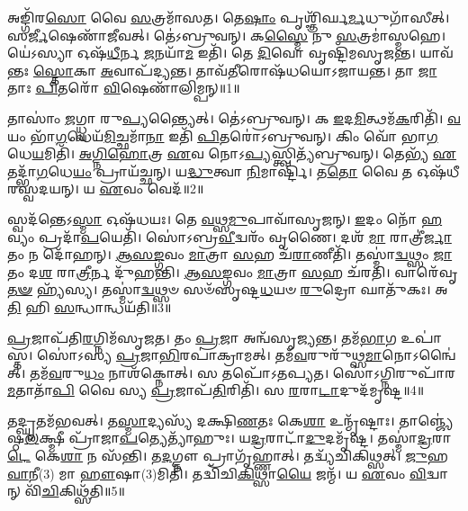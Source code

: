 \setcounter{anuvakam}{0}

𑌅𑌙𑍍𑌗𑌿᳴𑌰\-\ul{𑌸𑍋} 𑌵𑍈 \ul{𑌸}\-𑌤𑍍𑌰𑌮𑌾᳴𑌸𑌤।
𑌤𑍇\-\ul{𑌷𑌾𑌂} 𑌪𑍃𑌶𑍍𑌞𑌿᳴𑌰𑍍𑌘\-\ul{𑌰𑍍𑌮}\-𑌧𑍁𑌗𑌾᳴𑌸𑍀𑌤𑍍।
𑌸\-\ul{𑌰𑍍𑌜𑍀}\-𑌷𑍇𑌣𑌾᳴𑌜𑍀𑌵𑌤𑍍।
𑌤𑍇॑𑌽𑌬𑍍𑌰𑍁𑌵𑌨𑍍।
𑌕\-\ul{𑌸𑍍𑌮𑍈} 𑌨𑍁 \ul{𑌸}\-𑌤𑍍𑌰𑌮𑌾॑𑌸𑍍𑌮𑌹𑍇।
𑌯𑍇॑𑌽𑌸𑍍𑌯𑌾 𑌓𑌷᳴\-\ul{𑌧𑍀}\-𑌰𑍍𑌨 \ul{𑌜}\-𑌨𑌯𑌾᳴\-\ul{𑌮} 𑌇𑌤𑌿᳴।
𑌤𑍇 \ul{𑌦𑌿}\-𑌵𑍋 𑌵𑍃𑌷𑍍𑌟𑌿᳴𑌮𑌸𑍃𑌜𑌨𑍍𑌤।
𑌯𑌾𑌵᳴𑌨𑍍𑌤𑌃 \ul{𑌸𑍍𑌤𑍋}\-𑌕𑌾 \ul{𑌅}\-𑌵𑌾𑌪᳴𑌦𑍍𑌯𑌨𑍍𑌤।
𑌤𑌾𑌵᳴\-\ul{𑌤𑍀}\-𑌰𑍋𑌷᳴𑌧𑌯𑍋\-𑌽𑌜𑌾𑌯𑌨𑍍𑌤।
𑌤𑌾 \ul{𑌜𑌾}\-𑌤𑌾𑌃 \ul{𑌪𑌿}\-𑌤𑌰𑍋᳴ \ul{𑌵𑌿}\-𑌷𑍇𑌣𑌾᳴𑌲𑌿𑌮𑍍𑌪𑌨𑍍॥1॥

𑌤𑌾𑌸𑌾𑌂॑ \ul{𑌜}\-𑌗𑍍𑌧𑍍𑌵𑌾 𑌰𑍁\-\ul{𑌪𑍍𑌯}\-𑌨𑍍𑌤𑍍𑌯𑍈𑌤𑍍।
𑌤𑍇॑𑌽𑌬𑍍𑌰𑍁𑌵𑌨𑍍।
𑌕 \ul{𑌇}\-𑌦\-\ul{𑌮𑌿}\-𑌤𑍍𑌥𑌮᳴\-\ul{𑌕}\-𑌰𑌿𑌤𑌿᳴।
\-\ul{𑌵}\-𑌯𑌂 𑌭𑌾᳴\-\ul{𑌗}\-𑌧𑍇𑌯᳴\-\ul{𑌮𑌿}\-𑌚𑍍𑌛𑌮𑌾᳴\-\ul{𑌨𑌾} 𑌇𑌤𑌿᳴ \ul{𑌪𑌿}\-𑌤𑌰𑍋॑\-𑌽𑌬𑍍𑌰𑍁𑌵𑌨𑍍।
𑌕𑌿𑌂 𑌵𑍋᳴ 𑌭𑌾\-\ul{𑌗}\-𑌧𑍇\-\ul{𑌯}\-𑌮𑌿𑌤𑌿᳴।
\-\ul{𑌅}\-\-\ul{𑌗𑍍𑌨𑌿}\-\-\ul{𑌹𑍋}\-𑌤𑍍𑌰 \ul{𑌏}\-𑌵 𑌨𑍋𑌽\-\ul{𑌪𑍍𑌯}\-𑌸𑍍𑌤𑍍𑌵𑌿𑌤𑍍𑌯᳴𑌬𑍍𑌰𑍁𑌵𑌨𑍍।
𑌤𑍇𑌭𑍍𑌯᳴ \ul{𑌏}\-𑌤𑌦𑍍𑌭𑌾᳴\-\ul{𑌗}\-𑌧𑍇\-\ul{𑌯𑌂} 𑌪𑍍𑌰𑌾𑌯᳴𑌚𑍍𑌛𑌨𑍍।
𑌯\-\ul{𑌦𑍍𑌧𑍁}\-𑌤𑍍𑌵𑌾 \ul{𑌨𑌿}\-𑌮𑌾𑌰𑍍𑌷𑍍𑌟𑌿᳴।
𑌤\-\ul{𑌤𑍋} 𑌵𑍈 𑌤 𑌓𑌷᳴𑌧𑍀𑌰𑌸𑍍𑌵𑌦𑌯𑌨𑍍।
𑌯 \ul{𑌏}\-𑌵𑌂 𑌵𑍇𑌦᳴॥2॥

𑌸𑍍𑌵𑌦᳴𑌨𑍍𑌤𑍇\-𑌽\-\ul{𑌸𑍍𑌮𑌾} 𑌓𑌷᳴𑌧𑌯𑌃।
𑌤𑍇 \ul{𑌵}\-𑌥𑍍𑌸\-\ul{𑌮𑍁}\-𑌪𑌾𑌵𑌾᳴𑌸𑍃𑌜𑌨𑍍।
\-\ul{𑌇}\-𑌦𑌂 𑌨𑍋᳴ \ul{𑌹}\-𑌵𑍍𑌯𑌂 𑌪𑍍𑌰𑌦𑌾᳴\-\ul{𑌪}\-𑌯𑍇𑌤𑌿᳴।
𑌸𑍋॑𑌽𑌬𑍍𑌰\-\ul{𑌵𑍀}\-𑌦𑍍𑌵𑌰𑌂᳴ 𑌵𑍃𑌣𑍈।
𑌦𑌶᳴ \ul{𑌮𑌾} 𑌰𑌾𑌤𑍍𑌰𑍀॑\-\ul{𑌰𑍍𑌜𑌾}\-𑌤𑌂 𑌨 𑌦𑍋᳴𑌹𑌨𑍍।
\-\ul{𑌆}\-\-\ul{𑌸}\-\-\ul{𑌙𑍍𑌗}\-𑌵𑌂 \ul{𑌮𑌾}\-𑌤𑍍𑌰𑌾 \ul{𑌸}\-𑌹 𑌚᳴\-\ul{𑌰𑌾}\-𑌣𑍀𑌤𑌿᳴।
𑌤𑌸𑍍𑌮𑌾॑\-\ul{𑌦𑍍𑌵}\-𑌥𑍍𑌸𑌂 \ul{𑌜𑌾}\-𑌤𑌂 𑌦\-\ul{𑌶} 𑌰𑌾\-\ul{𑌤𑍍𑌰𑍀}\-𑌰𑍍𑌨 𑌦𑍁᳴𑌹𑌨𑍍𑌤𑌿।
\-\ul{𑌆}\-\-\ul{𑌸}\-\-\ul{𑌙𑍍𑌗}\-𑌵𑌂 \ul{𑌮𑌾}\-𑌤𑍍𑌰𑌾 \ul{𑌸}\-𑌹 𑌚᳴𑌰𑌤𑌿।
𑌵𑌾𑌰𑍇᳴𑌵𑍃\-\ul{𑌤}\-\-\ul{𑍟} 𑌹𑍍𑌯᳴𑌸𑍍𑌯।
𑌤𑌸𑍍𑌮𑌾॑\-\ul{𑌦𑍍𑌵}\-𑌥𑍍𑌸𑍞 𑌸𑍞᳴𑌸𑍃𑌷𑍍𑌟\-\ul{𑌧}\-𑌯𑍞 \ul{𑌰𑍁}\-𑌦𑍍𑌰𑍋 𑌘𑌾𑌤𑍁᳴𑌕𑌃।
𑌅\-\ul{𑌤𑌿} 𑌹𑌿 \ul{𑌸}\-𑌨𑍍𑌧𑌾𑌨𑍍𑌧𑌯᳴𑌤𑌿॥3॥\anuvakamend[\-\ul{𑌅}\-\-\ul{𑌲𑌿}\-\-\ul{𑌮𑍍𑌪}\-𑌨𑍍𑌵𑍇\-\ul{𑌦} 𑌘𑌾𑌤𑍁᳴\-\ul{𑌕} 𑌏𑌕𑌂᳴ 𑌚]

\-\ul{𑌪𑍍𑌰}\-𑌜𑌾𑌪᳴𑌤𑌿\-\ul{𑌰}\-𑌗𑍍𑌨𑌿𑌮᳴\-𑌸𑍃𑌜𑌤।
𑌤𑌂 \ul{𑌪𑍍𑌰}\-𑌜𑌾 𑌅𑌨𑍍𑌵᳴𑌸𑍃𑌜𑍍𑌯𑌨𑍍𑌤।
𑌤𑌮᳴\-\ul{𑌭𑌾}\-𑌗 𑌉𑌪𑌾॑𑌸𑍍𑌤।
𑌸𑍋॑𑌽𑌸𑍍𑌯 \ul{𑌪𑍍𑌰}\-𑌜𑌾\-\ul{𑌭𑌿}\-𑌰𑌪𑌾॑𑌕𑍍𑌰𑌾𑌮𑌤𑍍।
𑌤𑌮᳴\-\ul{𑌵}\-𑌰𑍁𑌰𑍁᳴𑌥𑍍𑌸\-\ul{𑌮𑌾}\-𑌨𑍋\-𑌽𑌨𑍍𑌵𑍈॑𑌤𑍍।
𑌤𑌮᳴\-\ul{𑌵}\-𑌰𑍁\-\ul{𑌧𑌂} 𑌨𑌾𑌶᳴𑌕𑍍𑌨𑍋𑌤𑍍।
𑌸 𑌤𑌪𑍋᳴\-𑌽𑌤𑌪𑍍𑌯𑌤।
𑌸𑍋॑𑌽𑌗𑍍𑌨𑌿𑌰𑍁𑌪𑌾᳴𑌰\-\ul{𑌮}\-𑌤𑌾𑌤𑌾᳴\-\ul{𑌪𑌿} 𑌵𑍈 𑌸𑍍𑌯 \ul{𑌪𑍍𑌰}\-𑌜𑌾𑌪᳴\-\ul{𑌤𑌿}\-𑌰𑌿𑌤𑌿᳴।
𑌸 \ul{𑌰}\-𑌰𑌾\-\ul{𑌟𑌾}\-𑌦𑍁𑌦᳴𑌮𑍃𑌷𑍍𑌟॥4॥

𑌤𑌦𑍍\mbox{}\-\ul{𑌘𑍃}\-𑌤𑌮᳴𑌭𑌵𑌤𑍍।
𑌤\-\ul{𑌸𑍍𑌮𑌾}\-𑌦𑍍𑌯𑌸𑍍𑌯᳴ 𑌦𑌕𑍍𑌷𑌿\-\ul{𑌣}\-𑌤𑌃 𑌕𑍇\-\ul{𑌶𑌾} 𑌉𑌨𑍍𑌮𑍃᳴𑌷𑍍𑌟𑌾𑌃।
𑌤𑌾𑌞𑍍𑌜𑍍𑌯𑍇॑𑌷𑍍𑌠\-\ul{𑌲}\-𑌕𑍍𑌷𑍍𑌮𑍀 𑌪𑍍𑌰𑌾᳴𑌜𑌾\-\ul{𑌪}\-𑌤𑍍𑌯𑍇𑌤𑍍𑌯𑌾᳴𑌹𑍁𑌃।
𑌯\-\ul{𑌦𑍍𑌰}\-𑌰𑌾𑌟𑌾᳴\-\ul{𑌦𑍁}\-𑌦𑌮𑍃᳴𑌷𑍍𑌟।
𑌤𑌸𑍍𑌮𑌾॑\-\ul{𑌦𑍍𑌰}\-𑌰𑌾\-\ul{𑌟𑍇} 𑌕𑍇\-\ul{𑌶𑌾} 𑌨 𑌸᳴𑌨𑍍𑌤𑌿।
𑌤\-\ul{𑌦}\-𑌗𑍍𑌨𑍗 𑌪𑍍𑌰𑌾𑌗𑍃᳴𑌹𑍍𑌣𑌾𑌤𑍍।
𑌤𑌦𑍍𑌵𑍍𑌯᳴𑌚𑌿𑌕𑌿𑌥𑍍𑌸𑌤𑍍।
\-\ul{𑌜𑍁}\-𑌹\-\ul{𑌵𑌾}\-𑌨𑍀(3) 𑌮𑌾 \ul{𑌹𑍗}\-𑌷𑌾(3)𑌮𑌿𑌤𑌿᳴।
𑌤𑌦𑍍𑌵𑌿᳴𑌚𑌿\-\ul{𑌕𑌿}\-𑌥𑍍𑌸𑌾\-\ul{𑌯𑍈} 𑌜𑌨𑍍𑌮᳴।
𑌯 \ul{𑌏}\-𑌵𑌂 \ul{𑌵𑌿}\-𑌦𑍍𑌵𑌾𑌨𑍍 𑌵𑌿᳴\-\ul{𑌚𑌿}\-𑌕𑌿𑌥𑍍𑌸᳴𑌤𑌿॥5॥

